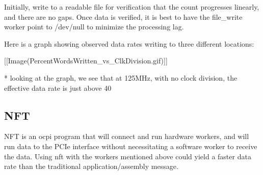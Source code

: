 
Initially, write to a readable file for verification that the count progresses linearly, and there are no gaps.  Once data is verified, it is best to have the file\_write worker point to /dev/null to minimize the processing lag.

Here is a graph showing observed data rates writing to three different locations:


[[Image(PercentWordsWritten\_vs\_ClkDivision.gif)]]


* looking at the graph, we see that at 125MHz, with no clock division, the effective data rate is just above 40%

\subsection{NFT}

NFT is an ocpi program that will connect and run hardware workers, and will run data to the PCIe interface without necessitating a software worker to receive the data.  Using nft with the workers mentioned above could yield a faster data rate than the traditional application/assembly message.  
